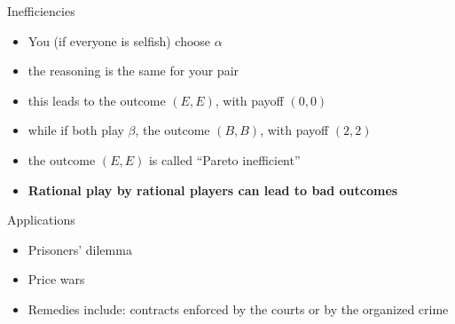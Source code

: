\documentclass{beamer}
\begin{document}
\begin{frame}{Inefficiencies}
  \begin{itemize}
  \item You (if everyone is selfish) choose $\alpha$
  \item<2-> the reasoning is the same for your pair
  \item<3-> this leads to the outcome $(E,E)$, with payoff $(0,0)$
  \item<4-> while if both play $\beta$, the outcome $(B,B)$, with payoff $(2,2)$
  \item<5-> the outcome $(E,E)$ is called ``Pareto inefficient''
  \item<5-> \textbf{Rational play by rational players can lead to bad outcomes}
  \end{itemize}
\end{frame}

\begin{frame}{Applications}
  \begin{itemize}
  \item Prisoners' dilemma
  \item Price wars
  \item Remedies include: contracts enforced by the courts or by the
    organized crime
  \end{itemize}
\end{frame}
\end{document}

